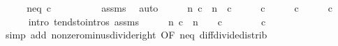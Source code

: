\begin{isabellebody}
%
\isadelimproof
%
\endisadelimproof
%
\isatagproof
{}\isamarkupfalse%
\ {\isacharminus}{\kern0pt}\isanewline
\ \ \isamarkupfalse%
\ neq{\isacharunderscore}{\kern0pt}{}{\isacharcolon}{\kern0pt}\ {\isachardoublequoteopen}c\ {\isacharminus}{\kern0pt}\ {}\ {\isasymnoteq}\ {}{\isachardoublequoteclose}\isanewline
\ \ \ \ \isamarkupfalse%
\ assms\ \isamarkupfalse%
\ auto\isanewline
\ \ \isamarkupfalse%
\ \isamarkupfalse%
\ {\isachardoublequoteopen}{\isacharparenleft}{\kern0pt}{\isasymlambda}n{\isachardot}{\kern0pt}\ c\ {\isacharcircum}{\kern0pt}\ n\ {\isacharslash}{\kern0pt}\ {\isacharparenleft}{\kern0pt}c\ {\isacharminus}{\kern0pt}\ {}{\isacharparenright}{\kern0pt}\ {\isacharminus}{\kern0pt}\ {}\ {\isacharslash}{\kern0pt}\ {\isacharparenleft}{\kern0pt}c\ {\isacharminus}{\kern0pt}\ {}{\isacharparenright}{\kern0pt}{\isacharparenright}{\kern0pt}\ {\isasymlonglonglongrightarrow}\ {}\ {\isacharslash}{\kern0pt}\ {\isacharparenleft}{\kern0pt}c\ {\isacharminus}{\kern0pt}\ {}{\isacharparenright}{\kern0pt}\ {\isacharminus}{\kern0pt}\ {}\ {\isacharslash}{\kern0pt}\ {\isacharparenleft}{\kern0pt}c\ {\isacharminus}{\kern0pt}\ {}{\isacharparenright}{\kern0pt}{\isachardoublequoteclose}\isanewline
\ \ \ \ \isamarkupfalse%
\ {\isacharparenleft}{\kern0pt}intro\ tendsto{\isacharunderscore}{\kern0pt}intros\ assms{\isacharparenright}{\kern0pt}\isanewline
\ \ \isamarkupfalse%
\ \isamarkupfalse%
\ {\isachardoublequoteopen}{\isacharparenleft}{\kern0pt}{\isasymlambda}n{\isachardot}{\kern0pt}\ {\isacharparenleft}{\kern0pt}c\ {\isacharcircum}{\kern0pt}\ n\ {\isacharminus}{\kern0pt}\ {}{\isacharparenright}{\kern0pt}\ {\isacharslash}{\kern0pt}\ {\isacharparenleft}{\kern0pt}c\ {\isacharminus}{\kern0pt}\ {}{\isacharparenright}{\kern0pt}{\isacharparenright}{\kern0pt}\ {\isasymlonglonglongrightarrow}\ {}\ {\isacharslash}{\kern0pt}\ {\isacharparenleft}{\kern0pt}{}\ {\isacharminus}{\kern0pt}\ c{\isacharparenright}{\kern0pt}{\isachardoublequoteclose}\isanewline
\ \ \ \ \isamarkupfalse%
\ {\isacharparenleft}{\kern0pt}simp\ add{\isacharcolon}{\kern0pt}\ nonzero{\isacharunderscore}{\kern0pt}minus{\isacharunderscore}{\kern0pt}divide{\isacharunderscore}{\kern0pt}right\ {\isacharbrackleft}{\kern0pt}OF\ neq{\isacharunderscore}{\kern0pt}{}{\isacharbrackright}{\kern0pt}\ diff{\isacharunderscore}{\kern0pt}divide{\isacharunderscore}{\kern0pt}distrib{\isacharparenright}{\kern0pt}\isanewline

\end{isabellebody}
